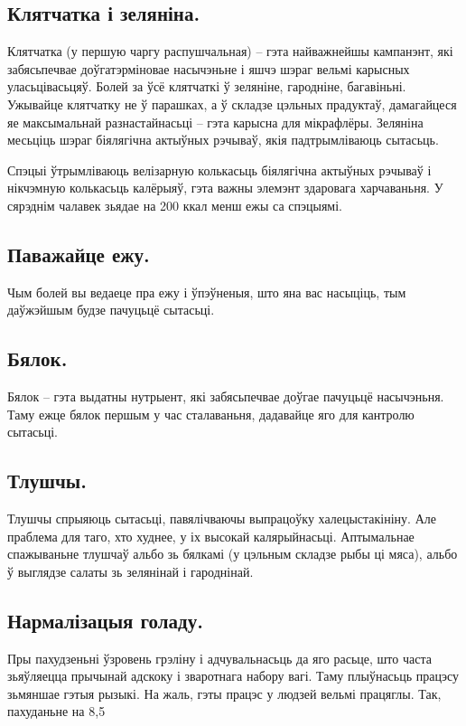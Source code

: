 \subsection{Клятчатка і зеляніна.}
Клятчатка (у першую чаргу распушчальная) – гэта найважнейшы кампанэнт, які забясьпечвае доўгатэрміновае насычэньне і яшчэ шэраг вельмі карысных уласьцівасьцяў. Болей за ўсё клятчаткі ў зеляніне, гародніне, багавіньні. Ужывайце клятчатку не ў парашках, а ў складзе цэльных прадуктаў, дамагайцеся яе максымальнай разнастайнасьці – гэта карысна для мікрафлёры. Зеляніна месьціць шэраг біялягічна актыўных рэчываў, якія падтрымліваюць сытасьць.

Спэцыі ўтрымліваюць велізарную колькасьць біялягічна актыўных рэчываў і нікчэмную колькасьць калёрыяў, гэта важны элемэнт здаровага харчаваньня. У сярэднім чалавек зьядае на 200 ккал менш ежы са спэцыямі.

\subsection{Паважайце ежу.}
Чым болей вы ведаеце пра ежу і ўпэўненыя, што яна вас насыціць, тым даўжэйшым будзе пачуцьцё сытасьці.

\subsection{Бялок.}
Бялок – гэта выдатны нутрыент, які забясьпечвае доўгае пачуцьцё насычэньня. Таму ежце бялок першым у час сталаваньня, дадавайце яго для кантролю сытасьці.

\subsection{Тлушчы.}
Тлушчы спрыяюць сытасьці, павялічваючы выпрацоўку халецыстакініну. Але праблема для таго, хто худнее, у іх высокай калярыйнасьці. Аптымальнае спажываньне тлушчаў альбо зь бялкамі (у цэльным складзе рыбы ці мяса), альбо ў выглядзе салаты зь зелянінай і гароднінай.

\subsection{Нармалізацыя голаду.}
Пры пахудзеньні ўзровень грэліну і адчувальнасьць да яго расьце, што часта зьяўляецца прычынай адскоку і зваротнага набору вагі. Таму плыўнасьць працэсу зьмяншае гэтыя рызыкі. На жаль, гэты працэс у людзей вельмі працяглы. Так, пахуданьне на 8,5%

